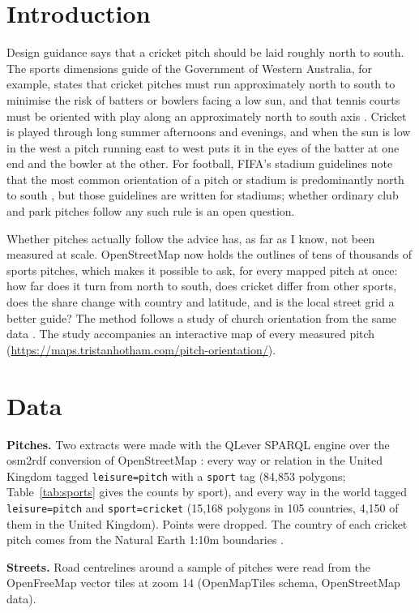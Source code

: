 \documentclass[11pt,a4paper]{article}
\begin{document}
\section{Introduction}
Design guidance says that a cricket pitch should be laid roughly north to south. The sports dimensions guide of the Government of Western Australia, for example, states that cricket pitches must run approximately north to south to minimise the risk of batters or bowlers facing a low sun, and that tennis courts must be oriented with play along an approximately north to south axis \citep{wa}. Cricket is played through long summer afternoons and evenings, and when the sun is low in the west a pitch running east to west puts it in the eyes of the batter at one end and the bowler at the other. For football, FIFA's stadium guidelines note that the most common orientation of a pitch or stadium is predominantly north to south \citep{fifa}, but those guidelines are written for stadiums; whether ordinary club and park pitches follow any such rule is an open question.

Whether pitches actually follow the advice has, as far as I know, not been measured at scale. OpenStreetMap \citep{osm} now holds the outlines of tens of thousands of sports pitches, which makes it possible to ask, for every mapped pitch at once: how far does it turn from north to south, does cricket differ from other sports, does the share change with country and latitude, and is the local street grid a better guide? The method follows a study of church orientation from the same data \citep{churches}. The study accompanies an interactive map of every measured pitch (\url{https://maps.tristanhotham.com/pitch-orientation/}).

\section{Data}
\textbf{Pitches.} Two extracts were made with the QLever SPARQL engine \citep{qlever} over the osm2rdf conversion of OpenStreetMap \citep{osm2rdf}: every way or relation in the United Kingdom tagged \texttt{leisure=pitch} with a \texttt{sport} tag (84,853 polygons; Table~\ref{tab:sports} gives the counts by sport), and every way in the world tagged \texttt{leisure=pitch} and \texttt{sport=cricket} (15,168 polygons in 105 countries, 4,150 of them in the United Kingdom). Points were dropped. The country of each cricket pitch comes from the Natural Earth 1:10m boundaries \citep{ne}.

\textbf{Streets.} Road centrelines around a sample of pitches were read from the OpenFreeMap vector tiles \citep{ofm} at zoom 14 (OpenMapTiles schema, OpenStreetMap data).
\end{document}
